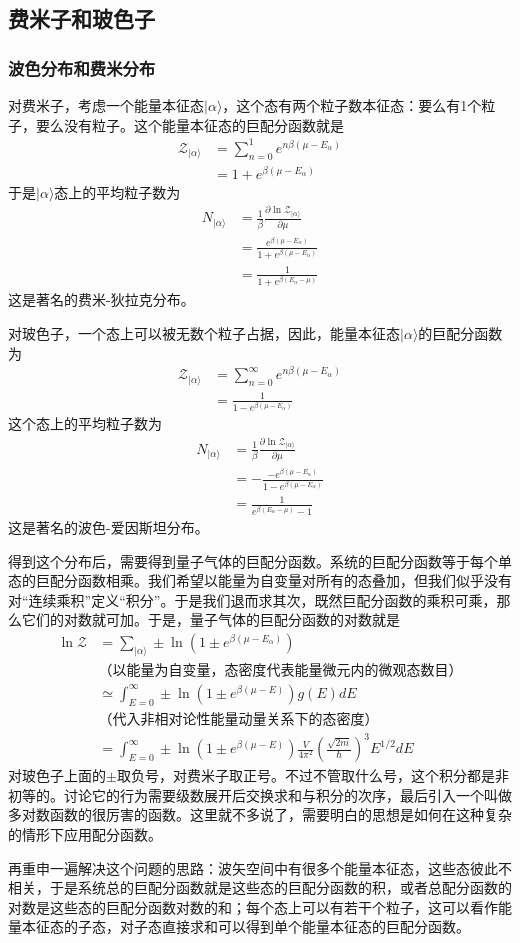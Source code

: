 \documentclass[a4paper,11pt]{ctexart}
\newcommand{\bea}{\begin{equation}\begin{aligned}}
\newcommand{\eea}{\end{aligned}\end{equation}}
\newcommand{\grandz}{\mathcal{Z}}
\begin{document}
\subsection{费米子和玻色子}
\subsubsection{波色分布和费米分布}
对费米子，考虑一个能量本征态$|\alpha \rangle$，这个态有两个粒子数本征态：要么有1个粒子，要么没有粒子。这个能量本征态的巨配分函数就是
\bea
\grandz_{|\alpha \rangle} &= \sum_{n=0}^1 e^{n\beta(\mu - E_\alpha)} \\
&= 1+ e^{\beta(\mu - E_\alpha)}
\eea
于是$|\alpha \rangle$态上的平均粒子数为
\bea
N_{|\alpha \rangle} &= \frac{1}{\beta} \frac{\partial \ln \grandz_{|\alpha \rangle}}{\partial \mu} \\
&=\frac{e^{\beta(\mu - E_\alpha)}}{1+e^{\beta(\mu - E_\alpha)}} \\
&= \frac{1}{1+e^{\beta(E_\alpha - \mu)}}
\eea
这是著名的费米-狄拉克分布。
\par
对玻色子，一个态上可以被无数个粒子占据，因此，能量本征态$|\alpha \rangle$的巨配分函数为
\bea \label{bez}
\grandz_{|\alpha \rangle} &= \sum_{n=0}^\infty e^{n\beta(\mu - E_\alpha)} \\
&= \frac{1}{1- e^{\beta(\mu - E_\alpha)}}
\eea
这个态上的平均粒子数为
\bea
N_{|\alpha \rangle} &= \frac{1}{\beta} \frac{\partial \ln \grandz_{|\alpha \rangle}}{\partial \mu} \\
&=-\frac{-e^{\beta(\mu - E_\alpha)}}{1-e^{\beta(\mu - E_\alpha)}} \\
&= \frac{1}{ e^{\beta(E_\alpha - \mu)} - 1}
\eea
这是著名的波色-爱因斯坦分布。
\par
得到这个分布后，需要得到量子气体的巨配分函数。系统的巨配分函数等于每个单态的巨配分函数相乘。我们希望以能量为自变量对所有的态叠加，但我们似乎没有对“连续乘积”定义“积分”。于是我们退而求其次，既然巨配分函数的乘积可乘，那么它们的对数就可加。于是，量子气体的巨配分函数的对数就是
\bea
\ln \grandz &= \sum_{|\alpha \rangle}\pm \ln (1 \pm e^{\beta(\mu - E_\alpha )}) \\
&\text{（以能量为自变量，态密度代表能量微元内的微观态数目）} \\
&\simeq \int_{E=0}^\infty \pm \ln (1 \pm e^{\beta(\mu - E)})g(E)dE \\
& \text{（代入非相对论性能量动量关系下的态密度）} \\
&=\int_{E=0}^\infty \pm \ln (1 \pm e^{\beta(\mu - E)})\frac{V}{4\pi^2} (\frac{\sqrt{2m}}{\hbar})^3 E^{1/2} dE
\eea
对玻色子上面的$\pm$取负号，对费米子取正号。不过不管取什么号，这个积分都是非初等的。讨论它的行为需要级数展开后交换求和与积分的次序，最后引入一个叫做多对数函数的很厉害的函数。这里就不多说了，需要明白的思想是如何在这种复杂的情形下应用配分函数。
\par
再重申一遍解决这个问题的思路：波矢空间中有很多个能量本征态，这些态彼此不相关，于是系统总的巨配分函数就是这些态的巨配分函数的积，或者总配分函数的对数是这些态的巨配分函数对数的和；每个态上可以有若干个粒子，这可以看作能量本征态的子态，对子态直接求和可以得到单个能量本征态的巨配分函数。
\end{document}
